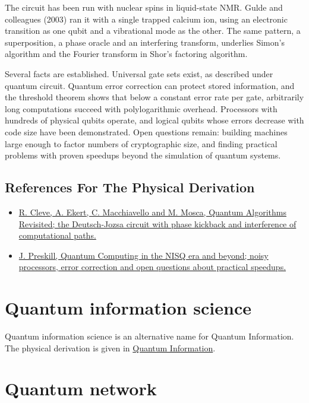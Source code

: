 \documentclass[11pt,oneside]{book}
\begin{document}
The circuit has been run with nuclear spins in liquid-state NMR. Gulde and colleagues (2003) ran it with a single trapped calcium ion, using an electronic transition as one qubit and a vibrational mode as the other. The same pattern, a superposition, a phase oracle and an interfering transform, underlies Simon's algorithm and the Fourier transform in Shor's factoring algorithm.

Several facts are established. Universal gate sets exist, as described under quantum circuit. Quantum error correction can protect stored information, and the threshold theorem shows that below a constant error rate per gate, arbitrarily long computations succeed with polylogarithmic overhead. Processors with hundreds of physical qubits operate, and logical qubits whose errors decrease with code size have been demonstrated. Open questions remain: building machines large enough to factor numbers of cryptographic size, and finding practical problems with proven speedups beyond the simulation of quantum systems.

\subsection*{References For The Physical Derivation}
\begin{itemize}
\item \href{https://arxiv.org/abs/quant-ph/9708016}{R. Cleve, A. Ekert, C. Macchiavello and M. Mosca, Quantum Algorithms Revisited; the Deutsch-Jozsa circuit with phase kickback and interference of computational paths.}
\item \href{https://arxiv.org/abs/1801.00862}{J. Preskill, Quantum Computing in the NISQ era and beyond; noisy processors, error correction and open questions about practical speedups.}
\end{itemize}





\clearpage
\section{Quantum information science}
\label{topic:quantum-information-science}
Quantum information science is an alternative name for Quantum Information.
The physical derivation is given in \hyperref[topic:quantum-information]{Quantum Information}.

\clearpage

\section{Quantum network}
\end{document}
